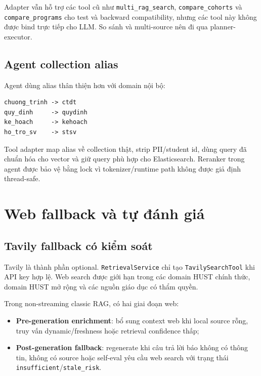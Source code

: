 \documentclass[../DoAn.tex]{subfiles}
\begin{document}
Adapter vẫn hỗ trợ các tool cũ như \texttt{multi\_rag\_search},
\texttt{compare\_cohorts} và \texttt{compare\_programs} cho test và backward
compatibility, nhưng các tool này không được bind trực tiếp cho LLM. So sánh và
multi-source nên đi qua planner-executor.

\subsection{Agent collection alias}

Agent dùng alias thân thiện hơn với domain nội bộ:

\begin{verbatim}
chuong_trinh -> ctdt
quy_dinh     -> quydinh
ke_hoach     -> kehoach
ho_tro_sv    -> stsv
\end{verbatim}

Tool adapter map alias về collection thật, strip PII/student id, dùng query đã
chuẩn hóa cho vector và giữ query phù hợp cho Elasticsearch. Reranker trong agent
được bảo vệ bằng lock vì tokenizer/runtime path không được giả định thread-safe.

\section{Web fallback và tự đánh giá}

\subsection{Tavily fallback có kiểm soát}

Tavily là thành phần optional. \texttt{RetrievalService} chỉ tạo
\texttt{TavilySearchTool} khi API key hợp lệ. Web search được giới hạn trong các
domain HUST chính thức, domain HUST mở rộng và các nguồn giáo dục có thẩm quyền.

Trong non-streaming classic RAG, có hai giai đoạn web:

\begin{itemize}
    \item \textbf{Pre-generation enrichment}: bổ sung context web khi local source
    rỗng, truy vấn dynamic/freshness hoặc retrieval confidence thấp;
    \item \textbf{Post-generation fallback}: regenerate khi câu trả lời báo
    không có thông tin, không có source hoặc self-eval yêu cầu web search với
    trạng thái \texttt{insufficient}/\texttt{stale\_risk}.
\end{itemize}
\end{document}
